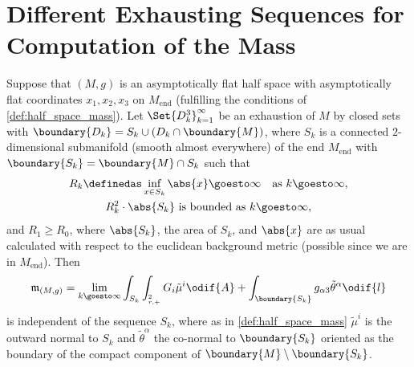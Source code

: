 \documentclass[titlepage,numbers=noenddot,headinclude,oneside,%
footinclude=true,cleardoublepage=empty,%
BCOR=5mm,paper=a4,fontsize=11pt,%
english,%
]{scrartcl}
\let\sphere\relax
\newcommand{\sphere}{\mathbb{S}}
\newcommand{\Mend}{M_{\mathrm{end}}} %
\newcommand{\mass}[2]{\mathfrak{m}_{(#1,#2)}} %
\begin{document}
\section{Different Exhausting Sequences for Computation of the Mass}
\begin{proposition}\label{prop:mass_independent_of_exhausting_sequence}
    Suppose that \( (M,g) \) is an asymptotically flat half space with asymptotically flat coordinates \( x_1,x_2,x_3 \) on \( \Mend \) (fulfilling the conditions of \cref{def:half_space_mass}). Let \( \Set{D_k^3}_{k=1}^{\infty} \) be an exhaustion of \( M \) by closed sets with \( \boundary{D_k}=S_k\cup (D_k\cap \boundary{M}) \), where \( S_k \) is a connected \( 2 \)-dimensional submanifold (smooth almost everywhere) of the end \( \Mend \) with \( \boundary{S_k}=\boundary{M}\cap S_k \) such that
    \begin{gather*}
        R_k\definedas \inf_{x\in S_k} \abs{x}\goesto \infty\quad \text{as \( k\goesto \infty \)},\\
        R_k^2\cdot \abs{S_k} \text{ is bounded as \( k\goesto \infty \)},
    \end{gather*}
    and \( R_1\geq R_0 \), where \( \abs{S_k} \), the area of \( S_k \), and \( \abs{x} \) are as usual calculated with respect to the euclidean background metric (possible since we are in \( \Mend \)). Then
    \begin{equation*}
        \mass{M}{g}=\lim_{k \goesto \infty}\int_{S_k}\int_{\sphere_{r,+}^{2}}G_i\tilde{\mu}^i\odif{A}+\int_{\boundary{S_k}}g_{\alpha 3}\tilde{\theta}^\alpha\odif{l}
    \end{equation*}
    is independent of the sequence \( S_k \), where as in \cref{def:half_space_mass} \( \tilde{\mu}^i \) is the outward normal to \( S_k \) and \( \tilde{\theta}^\alpha \) the co-normal to \( \boundary{S_k} \) oriented as the boundary of the compact component of \( \boundary{M}\setminus \boundary{S_k} \).
\end{proposition}
\end{document}
